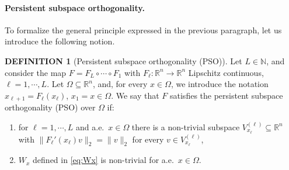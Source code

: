 \documentclass{article}
\theoremstyle{plain}
\theoremstyle{definition}
\newtheorem{definition}[theorem]{DEFINITION}
\theoremstyle{definition}
\theoremstyle{remark}
\theoremstyle{definition}
\theoremstyle{definition}
\theoremstyle{remark}
\numberwithin{equation}{section}
\begin{document}
\paragraph{Persistent subspace orthogonality.}
To formalize the general principle expressed in the previous paragraph, let us introduce the following notion.
\begin{definition}[Persistent subspace orthogonality (PSO)]\label{def:pso}
Let $L\in\mathbb{N}$, and consider the map $F=F_L\circ \cdots \circ F_1$ with $F_\ell:\mathbb{R}^n\to\mathbb{R}^n$ Lipschitz continuous, $\ell=1,\cdots,L$. Let $\Omega\subseteq\mathbb{R}^n$, and, for every $x\in\Omega$, we introduce the notation $x_{\ell+1}=F_\ell(x_\ell)$, $x_1=x\in\Omega$. We say that $F$ satisfies the persistent subspace orthogonality (PSO) over $\Omega$ if:
\begin{enumerate}
    \item for $\ell=1,\cdots,L$ and a.e.\, $x\in\Omega$ there is a non-trivial subspace $V_{x_\ell}^{(\ell)}\subseteq\mathbb{R}^n$ with $\|F_\ell'(x_\ell)v\|_2=\|v\|_2$ for every $v\in V_{x_\ell}^{(\ell)}$,
    \item $W_x$ defined in \eqref{eq:Wx} is non-trivial for a.e.\, $x\in\Omega$.
\end{enumerate}
\end{definition}
\end{document}
